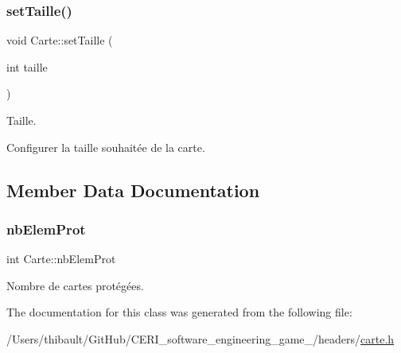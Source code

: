\subsubsection{\texorpdfstring{set\+Taille()}{setTaille()}}
{\footnotesize\ttfamily void Carte\+::set\+Taille (\begin{DoxyParamCaption}\item[{int}]{taille }\end{DoxyParamCaption})}



Taille. 

Configurer la taille souhaitée de la carte. 

\subsection{Member Data Documentation}
\mbox{\label{class_carte_a178a9ab642172029fec42f1c1cfa40ce}} 
\subsubsection{\texorpdfstring{nb\+Elem\+Prot}{nbElemProt}}
{\footnotesize\ttfamily int Carte\+::nb\+Elem\+Prot\hspace{0.3cm}{\ttfamily [static]}}



Nombre de cartes protégées. 



The documentation for this class was generated from the following file\+:\begin{DoxyCompactItemize}
\item 
/\+Users/thibault/\+Git\+Hub/\+C\+E\+R\+I\+\_\+software\+\_\+engineering\+\_\+game\+\_/headers/\hyperlink{carte_8h}{carte.\+h}\end{DoxyCompactItemize}
